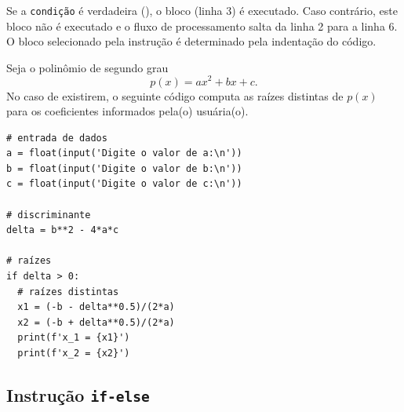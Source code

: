 Se a {\lstinline+condição+} é verdadeira ({\PYTHONTrue}), o bloco (linha 3) é executado. Caso contrário, este bloco não é executado e o fluxo de processamento salta da linha 2 para a linha 6. O bloco selecionado pela instrução {\PYTHONif} é determinado pela indentação do código.

\begin{ex}\label{cap_progest_sec_ramifica:ex:bhaskara_if}
  Seja o polinômio de segundo grau
  \begin{equation}
    p(x) = ax^2 + bx + c.
  \end{equation}
  No caso de existirem, o seguinte código computa as raízes distintas de $p(x)$ para os coeficientes informados pela(o) usuária(o).

\begin{lstlisting}
# entrada de dados
a = float(input('Digite o valor de a:\n'))
b = float(input('Digite o valor de b:\n'))
c = float(input('Digite o valor de c:\n'))

# discriminante
delta = b**2 - 4*a*c

# raízes
if delta > 0:
  # raízes distintas
  x1 = (-b - delta**0.5)/(2*a)
  x2 = (-b + delta**0.5)/(2*a)
  print(f'x_1 = {x1}')
  print(f'x_2 = {x2}')
\end{lstlisting}

\end{ex}




\subsection{Instrução \texttt{if-else}}

